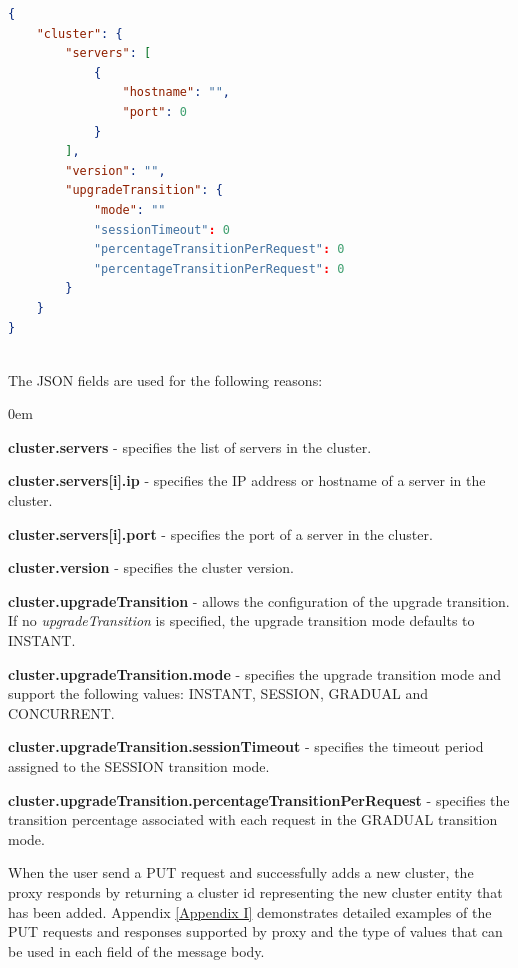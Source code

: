 \documentclass[a4paper,11pt,twoside]{report}
\begin{document}
\begin{lstlisting}[language=json]
{
    "cluster": {
        "servers": [
            {
                "hostname": "", 
                "port": 0
            }
        ], 
        "version": "", 
        "upgradeTransition": {
            "mode": ""
            "sessionTimeout": 0  
            "percentageTransitionPerRequest": 0
            "percentageTransitionPerRequest": 0  
        }
    }
}
\end{lstlisting}

\noindent\\
The JSON fields are used for the following reasons:

\begin{list}{-}{}
  \itemsep0em
  \item\textbf{{cluster.servers}} - specifies the list of servers in the cluster.
  
  \item\textbf{{cluster.servers[i].ip}} - specifies the IP address or hostname of a server in the cluster.
  
  \item\textbf{{cluster.servers[i].port}} - specifies the port of a server in the cluster.
  
  \item\textbf{{cluster.version}} - specifies the cluster version. 
  
  \item\textbf{{cluster.upgradeTransition}} - allows the configuration of the upgrade transition. If no \textit{upgradeTransition} is specified, the upgrade transition mode defaults to INSTANT.  
  
  \item\textbf{{cluster.upgradeTransition.mode}} - specifies the upgrade transition mode and support the following values: INSTANT, SESSION, GRADUAL and CONCURRENT.
   
  \item\textbf{{cluster.upgradeTransition.sessionTimeout}} - specifies the timeout period assigned to the SESSION transition mode.
  
  \item\textbf{{cluster.upgradeTransition.percentageTransitionPerRequest}} - specifies the transition percentage associated with each request in the GRADUAL transition mode.
\end{list}

\noindent
When the user send a PUT request and successfully adds a new cluster, the proxy responds by returning a cluster id representing the new cluster entity that has been added. Appendix \ref{Appendix  I} demonstrates detailed examples of the PUT requests and responses supported by proxy and the type of values that can be used in each field of the message body.
\end{document}
